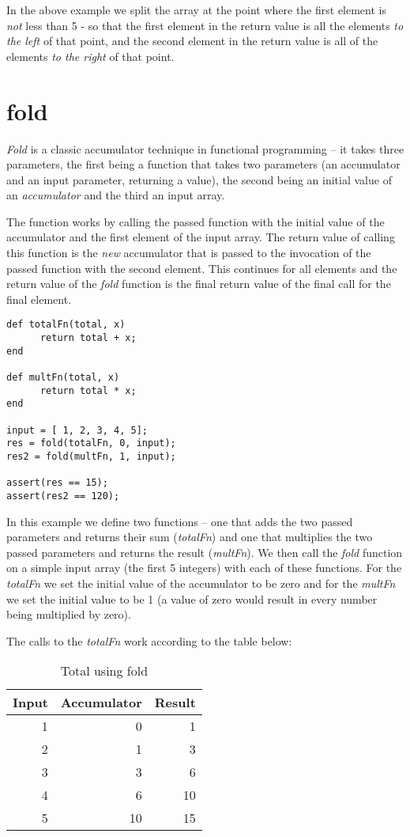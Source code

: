 In the above example we split the array at the point where the first element is \emph{not} less than 5 - so that the first element in the return value is all the elements \emph{to the left} of that point, and the second element in the return value is all of the elements \emph{to the right} of that point.

\section{fold}
\emph{Fold} is a classic accumulator technique in functional programming -- it takes three parameters, the first being a function that takes two parameters (an accumulator and an input parameter, returning a value), the second being an initial value of an \emph{accumulator} and the third an input array.

The function works by calling the passed function with the initial value of the accumulator and the first element of the input array. The return value of calling this function is the \emph{new} accumulator that is passed to the invocation of the passed function with the second element. This continues for all elements and the return value of the \emph{fold} function is the final return value of the final call for the final element.

\begin{lstlisting}[caption={Reflex fold example}]
def totalFn(total, x)
      return total + x;
end

def multFn(total, x)
      return total * x;
end

input = [ 1, 2, 3, 4, 5];
res = fold(totalFn, 0, input);
res2 = fold(multFn, 1, input);

assert(res == 15);
assert(res2 == 120);
\end{lstlisting}

In this example we define two functions -- one that adds the two passed parameters and returns their sum (\emph{totalFn}) and one that multiplies the two passed parameters and returns the result (\emph{multFn}). We then call the \emph{fold} function on a simple input array (the first 5 integers) with each of these functions. For the \emph{totalFn} we set the initial value of the accumulator to be zero and for the \emph{multFn} we set the initial value to be 1 (a value of zero would result in every number being multiplied by zero).

The calls to the \emph{totalFn} work according to the table below:

\begin{table}[!h]
\centering
\begin{tabular} { | r | r | r  | }
\hline
Input  & Accumulator & Result   \\
\hline
1 & 0 & 1 \\
2 & 1 & 3 \\
3 & 3 & 6 \\
4 & 6 & 10 \\
5 & 10 & 15 \\
\hline
\end{tabular}
\caption{Total using fold}
\end{table}

